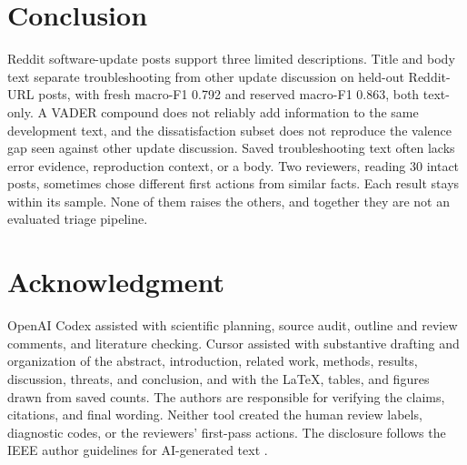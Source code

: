 \documentclass[conference,letterpaper]{IEEEtran}
\begin{document}
\section{Conclusion}
Reddit software-update posts support three limited descriptions. Title and body text separate troubleshooting from other update discussion on held-out Reddit-URL posts, with fresh macro-F1 0.792 and reserved macro-F1 0.863, both text-only. A VADER compound does not reliably add information to the same development text, and the dissatisfaction subset does not reproduce the valence gap seen against other update discussion. Saved troubleshooting text often lacks error evidence, reproduction context, or a body. Two reviewers, reading 30 intact posts, sometimes chose different first actions from similar facts. Each result stays within its sample. None of them raises the others, and together they are not an evaluated triage pipeline.

\section*{Acknowledgment}
OpenAI Codex assisted with scientific planning, source audit, outline and review comments, and literature checking. Cursor assisted with substantive drafting and organization of the abstract, introduction, related work, methods, results, discussion, threats, and conclusion, and with the LaTeX, tables, and figures drawn from saved counts. The authors are responsible for verifying the claims, citations, and final wording. Neither tool created the human review labels, diagnostic codes, or the reviewers' first-pass actions. The disclosure follows the IEEE author guidelines for AI-generated text \cite{IEEE2024AIText}.



\end{document}
